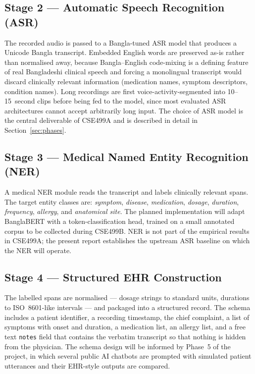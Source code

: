 \documentclass[12pt,a4paper]{article}
\begin{document}
\subsection{Stage 2 --- Automatic Speech Recognition (ASR)}
The recorded audio is passed to a Bangla-tuned ASR model that
produces a Unicode Bangla transcript. Embedded English words are
preserved as-is rather than normalised away, because Bangla--English
code-mixing is a defining feature of real Bangladeshi clinical
speech and forcing a monolingual transcript would discard
clinically relevant information (medication names, symptom
descriptors, condition names). Long recordings are first
voice-activity-segmented into 10--15~second clips before being fed
to the model, since most evaluated ASR architectures cannot accept
arbitrarily long input. The choice of ASR model is the central
deliverable of CSE499A and is described in detail in
Section~\ref{sec:phases}.

\subsection{Stage 3 --- Medical Named Entity Recognition (NER)}
A medical NER module reads the transcript and labels clinically
relevant spans. The target entity classes are:
\textit{symptom}, \textit{disease}, \textit{medication},
\textit{dosage}, \textit{duration}, \textit{frequency},
\textit{allergy}, and \textit{anatomical site}. The planned
implementation will adapt BanglaBERT with a token-classification
head, trained on a small annotated corpus to be collected during
CSE499B. NER is not part of the empirical results in CSE499A; the
present report establishes the upstream ASR baseline on which the
NER will operate.

\subsection{Stage 4 --- Structured EHR Construction}
The labelled spans are normalised --- dosage strings to standard
units, durations to ISO~8601-like intervals --- and packaged into a
structured record. The schema includes a patient identifier, a
recording timestamp, the chief complaint, a list of symptoms with
onset and duration, a medication list, an allergy list, and a free
text \texttt{notes} field that contains the verbatim transcript so
that nothing is hidden from the physician. The schema design will
be informed by Phase~5 of the project, in which several public AI
chatbots are prompted with simulated patient utterances and their
EHR-style outputs are compared.
\end{document}
